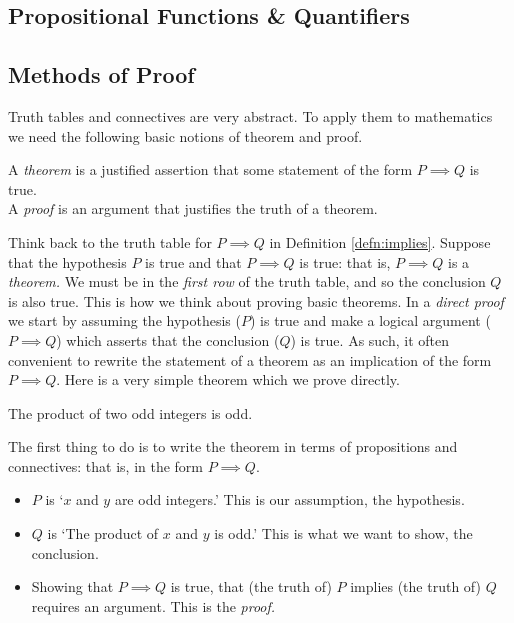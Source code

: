 \subsection{Propositional Functions \& Quantifiers}\label{sec:quant}


\subsection{Methods of Proof}\label{sec:proof}


Truth tables and connectives are very abstract. To apply them to mathematics we need the following basic notions of theorem and proof.

\begin{defn}{}{}
A \emph{theorem} is a justified assertion that some statement of the form $P\implies Q$ is true.\\
A \emph{proof} is an argument that justifies the truth of a theorem.
\end{defn}

 Think back to the truth table for $P\implies Q$ in Definition \ref{defn:implies}. Suppose that the hypothesis $P$ is true and that $P\implies Q$ is true: that is, $P\implies Q$ is a \emph{theorem.} We must be in the \emph{first row} of the truth table, and so the conclusion $Q$ is also true. This is how we think about proving basic theorems. In a \emph{direct proof} we start by assuming the hypothesis ($P$) is true and make a logical argument ($P\implies Q$) which asserts that the conclusion ($Q$) is true. As such, it often convenient to rewrite the statement of a theorem as an implication of the form $P\implies Q$. Here is a very simple theorem which we prove directly. 

\begin{thm}{}{}
The product of two odd integers is odd.
\end{thm}

 The first thing to do is to write the theorem in terms of propositions and connectives: that is, in the form $P\implies Q$.
\begin{itemize}
  \item $P$ is `$x$ and $y$ are odd integers.' This is our assumption, the hypothesis.
  \item $Q$ is `The product of $x$ and $y$ is odd.' This is what we want to show, the conclusion.
  \item Showing that $P\implies Q$ is true, that (the truth of) $P$ implies (the truth of) $Q$ requires an argument. This is the \emph{proof.}
\end{itemize}

